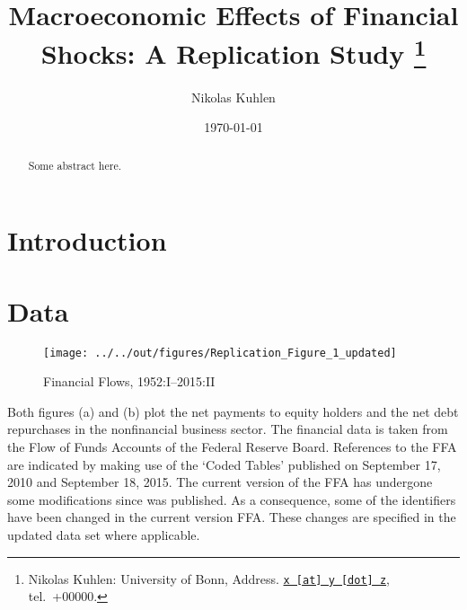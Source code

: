 \documentclass[11pt,a4paper,leqno]{article}
\begin{document}
\title{Macroeconomic Effects of Financial Shocks: A Replication Study
\thanks{Nikolas Kuhlen: University of Bonn, Address. \href{mailto:x@y.z} {\nolinkurl{x [at] y [dot] z}}, tel.~+00000.}
}

\author{Nikolas Kuhlen
}

\date{\today}

\maketitle


\begin{abstract}
	Some abstract here.
\end{abstract}
\clearpage

\section{Introduction} %
\label{sec:introduction}

\section{Data} %
\label{sec:data}


\begin{figure}
    
    \texttt{[image: ../../out/figures/Replication\_Figure\_1\_updated]}

    \caption{Financial Flows, 1952:I--2015:II}

\end{figure}

Both figures (a) and (b) plot the net payments to equity holders and the net debt repurchases in the nonfinancial business sector. The financial data is taken from the Flow of Funds Accounts of the Federal Reserve Board. References to the FFA are indicated by making use of the ‘Coded Tables’ published on September 17, 2010 and September 18, 2015. The current version of the FFA has undergone some modifications since \citet{JERMANNfinancial} was published. As a consequence, some of the identifiers have been changed in the current  version FFA. These changes are specified in the updated data set where applicable.
\end{document}
